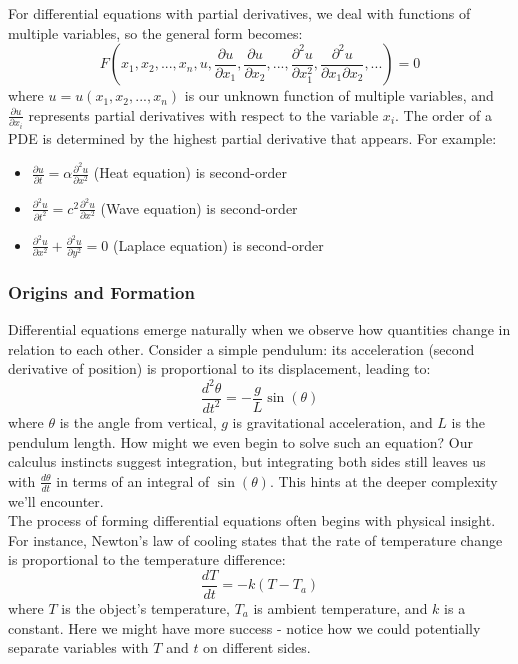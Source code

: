\noindent For differential equations with partial derivatives, we deal with functions of multiple variables, so the general form becomes:
\[
F(x_1, x_2, ..., x_n, u, \frac{\partial u}{\partial x_1}, \frac{\partial u}{\partial x_2}, ..., \frac{\partial^2 u}{\partial x_1^2}, \frac{\partial^2 u}{\partial x_1\partial x_2}, ...) = 0
\]
where $u = u(x_1, x_2, ..., x_n)$ is our unknown function of multiple variables, and $\frac{\partial u}{\partial x_i}$ represents partial derivatives with respect to the variable $x_i$. The order of a PDE is determined by the highest partial derivative that appears. For example:
\begin{itemize}
\item $\frac{\partial u}{\partial t} = \alpha\frac{\partial^2 u}{\partial x^2}$ (Heat equation) is second-order
\item $\frac{\partial^2 u}{\partial t^2} = c^2\frac{\partial^2 u}{\partial x^2}$ (Wave equation) is second-order
\item $\frac{\partial^2 u}{\partial x^2} + \frac{\partial^2 u}{\partial y^2} = 0$ (Laplace equation) is second-order
\end{itemize}

\subsubsection*{Origins and Formation}

\noindent Differential equations emerge naturally when we observe how quantities change in relation to each other. Consider a simple pendulum: its acceleration (second derivative of position) is proportional to its displacement, leading to:
\[
\frac{d^2\theta}{dt^2} = -\frac{g}{L}\sin(\theta)
\]
where $\theta$ is the angle from vertical, $g$ is gravitational acceleration, and $L$ is the pendulum length. How might we even begin to solve such an equation? Our calculus instincts suggest integration, but integrating both sides still leaves us with $\frac{d\theta}{dt}$ in terms of an integral of $\sin(\theta)$. This hints at the deeper complexity we'll encounter. \\

\noindent The process of forming differential equations often begins with physical insight. For instance, Newton's law of cooling states that the rate of temperature change is proportional to the temperature difference:
\[
\frac{dT}{dt} = -k(T - T_a)
\]
where $T$ is the object's temperature, $T_a$ is ambient temperature, and $k$ is a constant. Here we might have more success - notice how we could potentially separate variables with $T$ and $t$ on different sides. \\

